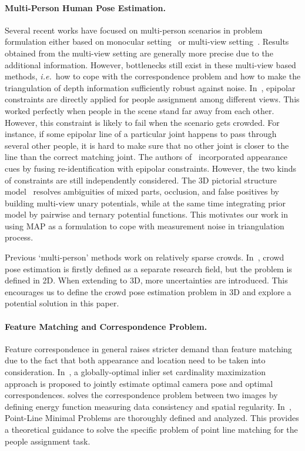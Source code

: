 \documentclass[runningheads]{llncs}
\def\ie{\emph{i.e.\ }}
\begin{document}
\paragraph {\bf{Multi-Person Human Pose Estimation. }} Several recent works have focused on multi-person scenarios in problem formulation either based on monocular setting~\cite{wang2018robust} or multi-view setting~\cite{belagiannis20143d,Authors42,belagiannis2014multiple,bogo2016keep,Authors26,kadkhodamohammadi2018generalizable}. Results obtained from the multi-view setting are generally more precise due to the additional information. However, bottlenecks still exist in these multi-view based methods, \ie how to cope with the correspondence problem and how to make the triangulation of depth information sufficiently robust against noise. In~\cite{kadkhodamohammadi2018generalizable}, epipolar constraints are directly applied for people assignment among different views. This worked perfectly when people in the scene stand far away from each other. However, this constraint is likely to fail when the scenario gets crowded. For instance, if some epipolar line of a particular joint happens to pass through several other people, it is hard to make sure that no other joint is closer to the line than the correct matching joint. The authors of~\cite{Authors26} incorporated appearance cues by fusing re-identification with epipolar constraints. However, the two kinds of constraints are still independently considered. The 3D pictorial structure model~\cite{belagiannis20143d,Authors42} resolves ambiguities of mixed parts, occlusion, and false positives by building multi-view unary potentials, while at the same time integrating prior model by pairwise and ternary potential functions. This motivates our work in using MAP as a formulation to cope with measurement noise in triangulation process. 

Previous `multi-person' methods work on relatively sparse crowds. In~\cite{li2019crowdpose}, crowd pose estimation is firstly defined as a separate research field, but the problem is defined in 2D. When extending to 3D, more uncertainties are introduced. This encourages us to define the crowd pose estimation problem in 3D and explore a potential solution in this paper.

\paragraph {\bf{Feature Matching and Correspondence Problem. }} Feature correspondence in general raises stricter demand than feature matching due to the fact that both appearance and location need to be taken into consideration. In~\cite{campbell2017globally}, a globally-optimal inlier set cardinality maximization approach is proposed to jointly estimate optimal camera pose and optimal correspondences. \cite{windheuser2016convex} solves the correspondence problem between two images by defining energy function measuring data consistency and spatial regularity. In~\cite{duff2019plmp}, Point-Line Minimal Problems are thoroughly defined and analyzed. This provides a theoretical guidance to solve the specific problem of point line matching for the people assignment task. 
\end{document}
